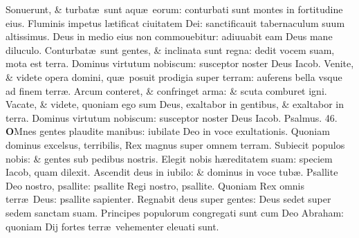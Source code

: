 \documentclass[a5paper,10pt]{book}
\def\ae{æ}
\begin{document}
\begin{multicols*}{2}
\newline \color{red} S\color{black}onuerunt, \& turbat\ae \ sunt aqu\ae \ eorum: conturbati sunt montes in fortitudine eius.
\newline \color{red} F\color{black}luminis impetus l\ae tificat ciuitatem Dei: sanctificauit tabernaculum suum altissimus.
\newline \color{red} D\color{black}eus in medio eius non commouebitur: adiuuabit eam Deus mane diluculo.
\newline \color{red} C\color{black}onturbat\ae \ sunt gentes, \& inclinata sunt regna: dedit vocem suam, mota est terra.
\newline \color{red} D\color{black}ominus virtutum nobiscum: susceptor noster Deus Iacob.
\newline \color{red} V\color{black}enite, \& videte opera domini, qu\ae \ posuit prodigia super terram: auferens bella vsque ad finem terr\ae .
\newline \color{red} A\color{black}rcum conteret, \& confringet arma: \& scuta comburet igni.
\newline \color{red} V\color{black}acate, \& videte, quoniam ego sum Deus, exaltabor in gentibus, \& exaltabor in terra.
\newline \color{red} D\color{black}ominus virtutum nobiscum: susceptor noster Deus Iacob. \quad \color{red} Psalmus. 46. \color{black}
\vspace{-1.5em}
\lettrine[lines=2]{\bfseries \color{red} O}{}Mnes gentes plaudite manibus: iubilate Deo in voce exultationis.
\newline \color{red} Q\color{black}uoniam dominus excelsus, terribilis, Rex magnus super omnem terram.
\newline \color{red} S\color{black}ubiecit populos nobis: \& gentes sub pedibus nostris.
\newline \color{red} E\color{black}legit nobis h\ae reditatem suam: speciem Iacob, quam dilexit.
\newline \color{red} A\color{black}scendit deus in iubilo: \& dominus in voce tub\ae .
\newline \color{red} P\color{black}sallite Deo nostro, psallite: psallite Regi nostro, psallite.
\newline \color{red} Q\color{black}uoniam Rex omnis terr\ae \ Deus: psallite sapienter.
\newline \color{red} R\color{black}egnabit deus super gentes: Deus sedet super sedem sanctam suam.
\newline \color{red} P\color{black}rincipes populorum congregati sunt cum Deo Abraham: quoniam Dij fortes terr\ae \ vehementer eleuati sunt.

\end{multicols*}
\end{document}
